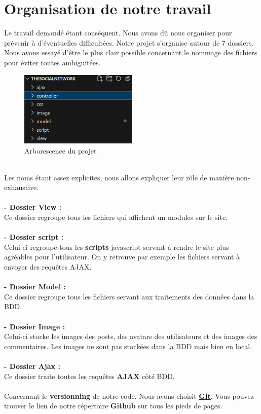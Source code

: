 \documentclass{article}
\begin{document}
\section{Organisation de notre travail}
Le travail demandé étant conséquent. Nous avons dû nous organiser pour prévenir à d'éventuelles difficultées. Notre projet s'organise autour de 7 dossiers. Nous avons essayé d'être le plus clair possible concernant le nommage des fichiers pour éviter toutes ambiguïtées.
\begin{figure}[h]\centering
\includegraphics[width=0.5\textwidth]{branche}	
\caption{Arborescence du projet}
\end{figure}\\
Les noms étant assez explicites, nous allons expliquer leur rôle de manière non-exhaustive.\\\\
\textbf{- Dossier View : }\\
Ce dossier regroupe tous les fichiers qui affichent un modules sur le site.\\\\
\textbf{- Dossier script : }\\
Celui-ci regroupe tous les \textbf{scripts} javascript servant à rendre le site plus agréables pour l'utilisateur. On y retrouve par exemple les fichiers servant à envoyer des requêtes AJAX.\\\\
\textbf{- Dossier Model : }\\
Ce dossier regroupe tous les fichiers servant aux traitements des données dans la BDD.\\\\
\textbf{- Dossier Image : }\\
Celui-ci stocke les images des posts, des avatars des utilisateurs et des images des commentaires. Les images ne sont pas stockées dans la BDD mais bien en local.\\\\
\textbf{- Dossier Ajax : }\\
Ce dossier traite toutes les requêtes \textbf{AJAX} côté BDD.\\\\
Concernant le \textbf{versionning} de notre code. Nous avons choisit \href{https://git-scm.com/}{\textbf{Git}}. Vous pouvez trouver le lien de notre répertoire \textbf{Github} sur tous les pieds de pages.
\end{document}
